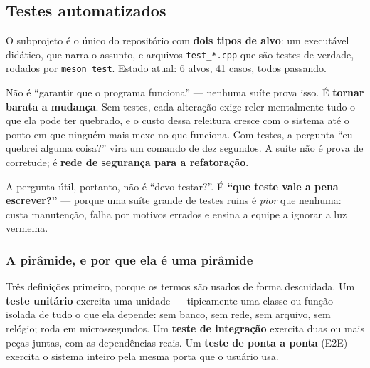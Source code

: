\subsection{Testes automatizados}
\label{sec:testes}

O subprojeto  é o único do repositório com \textbf{dois tipos de
alvo}: um executável didático, que narra o assunto, e arquivos
\texttt{test\_*.cpp} que são testes de verdade, rodados por \texttt{meson test}.
Estado atual: 6 alvos, 41 casos, todos passando.

\begin{porque}
Não é ``garantir que o programa funciona'' --- nenhuma suíte prova isso. É
\textbf{tornar barata a mudança}. Sem testes, cada alteração exige reler
mentalmente tudo o que ela pode ter quebrado, e o custo dessa releitura cresce
com o sistema até o ponto em que ninguém mais mexe no que funciona. Com testes, a
pergunta ``eu quebrei alguma coisa?'' vira um comando de dez segundos. A suíte
não é prova de corretude; é \textbf{rede de segurança para a refatoração}.
\end{porque}

A pergunta útil, portanto, não é ``devo testar?''. É \textbf{``que teste vale a
pena escrever?''} --- porque uma suíte grande de testes ruins é \emph{pior} que
nenhuma: custa manutenção, falha por motivos errados e ensina a equipe a ignorar
a luz vermelha.

\subsubsection{A pirâmide, e por que ela é uma pirâmide}

Três definições primeiro, porque os termos são usados de forma descuidada. Um
\textbf{teste unitário} exercita uma unidade --- tipicamente uma classe ou função
--- isolada de tudo o que ela depende: sem banco, sem rede, sem arquivo, sem
relógio; roda em microssegundos. Um \textbf{teste de integração} exercita duas ou
mais peças juntas, com as dependências reais. Um \textbf{teste de ponta a ponta}
(E2E) exercita o sistema inteiro pela mesma porta que o usuário usa.


